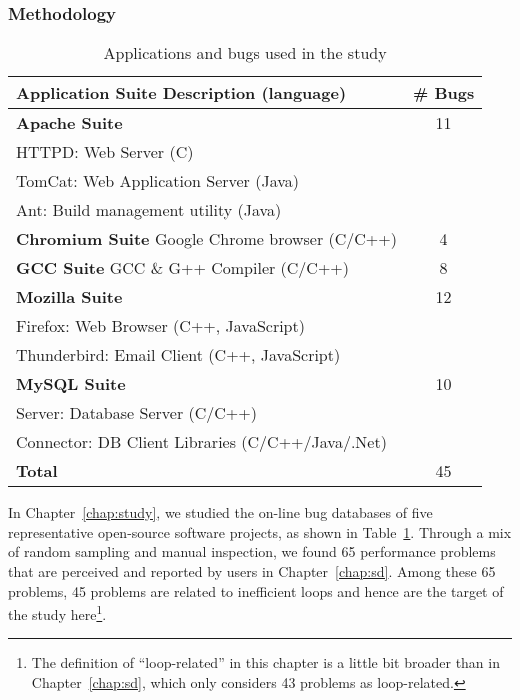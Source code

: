 \subsubsection{Methodology}
\begin{table}[h!]
\scriptsize
\centering
\begin{tabular}{@{\hspace{3pt}}l@{\hspace{3pt}}@{\hspace{3pt}}c@{\hspace{3pt}}}
\toprule
Application Suite Description (language) & \# Bugs \\
\midrule                            
{\bf Apache Suite} 	 & 11\\
{HTTPD:	Web Server (C)	}& \\
{TomCat:  Web Application Server (Java)}& \\
{Ant:	Build management utility (Java)}& \\
\midrule                            
{\bf Chromium Suite} Google Chrome browser (C/C++) & 4\\
\midrule
{\bf GCC Suite}  GCC \& G++ Compiler (C/C++)     & 8\\
\midrule
{\bf Mozilla Suite}  & 12\\
{Firefox: Web Browser (C++, JavaScript)}& 	\\
{Thunderbird: Email Client (C++, JavaScript)}& \\
\midrule
{\bf MySQL Suite}     & 10	\\
{Server: Database Server (C/C++)}&  	\\
{Connector: DB Client Libraries (C/C++/Java/.Net)} &  	\\
\midrule
{\bf Total}	   & 45 \\
\bottomrule
\end{tabular}
\caption{Applications and bugs used in the study}
\label{tab:6_app_bug}
\end{table}

In Chapter~\ref{chap:study}, we studied the on-line bug
databases of five representative open-source software projects, as 
shown in Table~\ref{tab:6_app_bug}. 
Through a mix of random sampling and 
manual inspection, we
found 65 performance problems that are perceived and reported by users in Chapter~\ref{chap:sd}. 
Among these 65 problems, 45 problems are related to inefficient loops and 
hence are the target of the study 
here\footnote{The definition of ``loop-related'' in this chapter is a little
bit broader than in Chapter~\ref{chap:sd}, which only considers
43 problems as loop-related. }.

